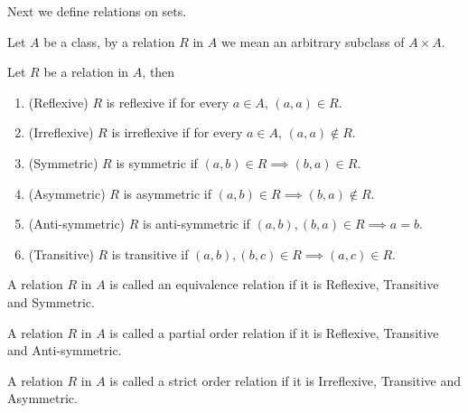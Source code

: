 Next we define relations on sets.
\begin{Definition}
    Let $A$ be a class, by a relation $R$ in $A$ we mean an arbitrary subclass of $A \times A$.
\end{Definition}
Let $R$ be a relation in $A$, then
\begin{enumerate}
    \item
	(Reflexive) $R$ is reflexive if for every $a \in A$, $(a,a) \in R$. 
    \item
	(Irreflexive) $R$ is irreflexive if for every $a \in A$, $(a,a) \not \in R$. 
    \item
	(Symmetric) $R$ is symmetric if $(a,b) \in R \implies (b,a) \in R$. 
    \item
	(Asymmetric) $R$ is asymmetric if $(a,b) \in R \implies (b,a) \not \in R$. 
    \item
	(Anti-symmetric) $R$ is anti-symmetric if $(a,b),(b,a) \in R \implies a=b $. 
    \item
	(Transitive) $R$ is transitive if $(a,b) ,(b,c) \in R \implies (a,c) \in R$. 
\end{enumerate}
\begin{Definition}
    A relation $R$ in $A$ is called an equivalence relation if it is Reflexive, Transitive and
    Symmetric.
\end{Definition}
\begin{Definition}
    A relation $R$ in $A$ is called a partial order relation if it is Reflexive, Transitive and
    Anti-symmetric.
\end{Definition}
\begin{Definition}
    A relation $R$ in $A$ is called a strict order relation if it is Irreflexive, Transitive and
    Asymmetric.
\end{Definition}

